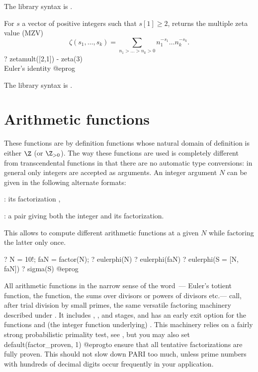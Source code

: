The library syntax is .

\label{se:zetamult}
For $s$ a vector of positive integers such that $s[1] \geq 2$,
returns the multiple zeta value (MZV)
$$\zeta(s_1,\dots, s_k) = \sum_{n_1>\dots>n_k>0} n_1^{-s_1}\dots n_k^{-s_k}.$$
\bprog
? zetamult([2,1]) - zeta(3) \\ Euler's identity
@eprog

The library syntax is .

\section{Arithmetic functions}\label{se:arithmetic}

These functions are by definition functions whose natural domain of
definition is either $\Z$ (or $\Z_{>0}$). The way these functions are used is
completely different from transcendental functions in that there are no
automatic type conversions: in general only integers are accepted as
arguments. An integer argument $N$ can be given in the following alternate
formats:

\item {}: its factorization ,

\item {}: a pair \kbd{[$N$, fa]} giving both the integer and
  its factorization.

This allows to compute different arithmetic functions at a given $N$
while factoring the latter only once.

\bprog
  ? N = 10!; faN = factor(N);
  ? eulerphi(N)
  ? eulerphi(faN)
  ? eulerphi(S = [N, faN])
  ? sigma(S)
@eprog

All arithmetic functions in the narrow sense of the word~--- Euler's
totient function, the  function,
the sums over divisors or powers of divisors etc.--- call, after trial
division by small primes, the same versatile factoring machinery described
under . It includes , ,
 and  stages, and has an early exit option for the
functions  and (the integer function underlying)
. This machinery relies on a fairly strong
probabilistic primality test, see , but you may also set
\bprog
  default(factor_proven, 1)
@eprog\noindent to ensure that all tentative factorizations are fully proven.
This should not slow down PARI too much, unless prime numbers with
hundreds of decimal digits occur frequently in your application.

